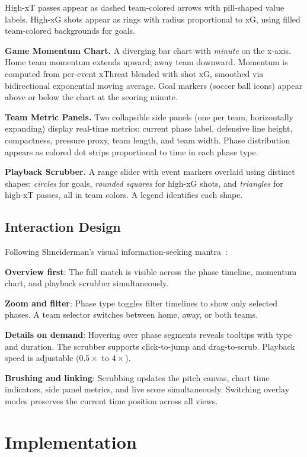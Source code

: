 \documentclass{vgtc}                          %
\begin{document}
High-xT passes appear as dashed team-colored arrows with pill-shaped value labels. High-xG shots appear as rings with radius proportional to xG, using filled team-colored backgrounds for goals.

\textbf{Game Momentum Chart.} A diverging bar chart with \emph{minute} on the x-axis. Home team momentum extends upward; away team downward. Momentum is computed from per-event xThreat blended with shot xG, smoothed via bidirectional exponential moving average. Goal markers (soccer ball icons) appear above or below the chart at the scoring minute.

\textbf{Team Metric Panels.} Two collapsible side panels (one per team, horizontally expanding) display real-time metrics: current phase label, defensive line height, compactness, pressure proxy, team length, and team width. Phase distribution appears as colored dot strips proportional to time in each phase type.

\textbf{Playback Scrubber.} A range slider with event markers overlaid using distinct shapes: \emph{circles} for goals, \emph{rounded squares} for high-xG shots, and \emph{triangles} for high-xT passes, all in team colors. A legend identifies each shape.

\subsection{Interaction Design}

Following Shneiderman's visual information-seeking mantra~\cite{shneiderman1996}:

\textbf{Overview first}: The full match is visible across the phase timeline, momentum chart, and playback scrubber simultaneously.

\textbf{Zoom and filter}: Phase type toggles filter timelines to show only selected phases. A team selector switches between home, away, or both teams.

\textbf{Details on demand}: Hovering over phase segments reveals tooltips with type and duration. The scrubber supports click-to-jump and drag-to-scrub. Playback speed is adjustable ($0.5{\times}$ to $4{\times}$).

\textbf{Brushing and linking}: Scrubbing updates the pitch canvas, chart time indicators, side panel metrics, and live score simultaneously. Switching overlay modes preserves the current time position across all views.

\section{Implementation}
\end{document}
